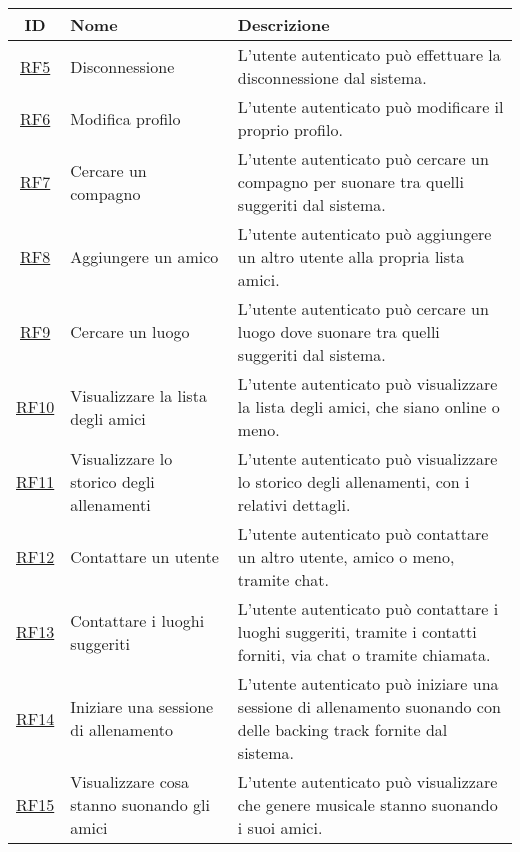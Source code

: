 \documentclass[12pt, a4paper]{article}
\begin{document}
\begin{longtable}{|c|p{5cm}|p{7cm}|}

    \hline \textbf{ID}            & \textbf{Nome}                               & \textbf{Descrizione}                                                                                                \\  \hline
    \hline \hyperlink{RF5}{RF5}   & Disconnessione                              & L'utente autenticato può effettuare la disconnessione dal sistema.                                                  \\ \hline
    \hline\hyperlink{RF6}{RF6}    & Modifica profilo                            & L'utente autenticato può modificare il proprio profilo.                                                             \\ \hline
    \hline \hyperlink{RF7}{RF7}   & Cercare un compagno                         & L'utente autenticato può cercare un compagno per suonare tra quelli suggeriti dal sistema.                          \\ \hline
    \hline \hyperlink{RF8}{RF8}   & Aggiungere un amico                         & L'utente autenticato può aggiungere un altro utente alla propria lista amici.                                       \\ \hline
    \hline \hyperlink{RF9}{RF9}   & Cercare un luogo                            & L'utente autenticato può cercare un luogo dove suonare tra quelli suggeriti dal sistema.                            \\ \hline
    \hline \hyperlink{RF10}{RF10} & Visualizzare la lista degli amici           & L'utente autenticato può visualizzare la lista degli amici, che siano online o meno.                                \\ \hline
    \hline \hyperlink{RF11}{RF11} & Visualizzare lo storico degli allenamenti   & L'utente autenticato può visualizzare lo storico degli allenamenti, con i relativi dettagli.                        \\ \hline
    \hline \hyperlink{RF12}{RF12} & Contattare un utente                        & L'utente autenticato può contattare un altro utente, amico o meno, tramite chat.                                    \\ \hline
    \hline \hyperlink{RF13}{RF13} & Contattare i luoghi suggeriti               & L'utente autenticato può contattare i luoghi suggeriti, tramite i contatti forniti, via chat o tramite chiamata.    \\ \hline
    \hline \hyperlink{RF14}{RF14} & Iniziare una sessione di allenamento        & L'utente autenticato può iniziare una sessione di allenamento suonando con delle backing track fornite dal sistema. \\ \hline
    \hline \hyperlink{RF15}{RF15} & Visualizzare cosa stanno suonando gli amici & L'utente autenticato può visualizzare che genere musicale stanno suonando i suoi amici.                             \\ \hline
\end{longtable}
\end{document}
